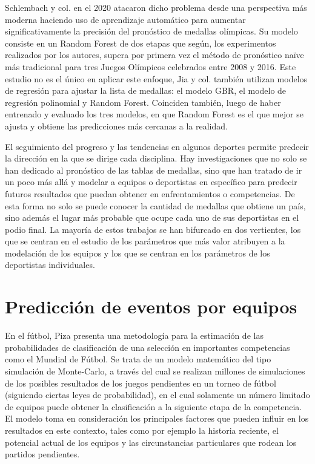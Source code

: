 Schlembach y col. en el 2020 \cite{schlembach2020forecasting} atacaron dicho problema desde una perspectiva más moderna haciendo uso de aprendizaje automático para aumentar significativamente la precisión del pronóstico de medallas olímpicas. Su modelo consiste en un Random Forest de dos etapas que según, los experimentos realizados por los autores, supera por primera vez el método de pronóstico naïve más tradicional para tres Juegos Olímpicos celebrados entre 2008 y 2016. Este estudio no es el único en aplicar este enfoque, Jia y col. también utilizan modelos de regresión para ajustar la lista de medallas: el modelo GBR, el modelo de regresión polinomial y Random Forest. Coinciden también, luego de haber entrenado y evaluado los tres modelos, en que Random Forest es el que mejor se ajusta y obtiene las predicciones más cercanas a la realidad.

El seguimiento del progreso y las tendencias en algunos deportes permite predecir la dirección en la que se dirige cada disciplina. Hay investigaciones que no solo se han dedicado al pronóstico de las tablas de medallas, sino que han tratado de ir un poco más allá y modelar a equipos o deportistas en específico para predecir futuros resultados que puedan obtener en enfrentamientos o competencias. De esta forma no solo se puede conocer la cantidad de medallas que obtiene un país, sino además el lugar más probable que ocupe cada uno de sus deportistas en el podio final. La mayoría de estos trabajos se han bifurcado en dos vertientes, los que se centran en el estudio de los parámetros que más valor atribuyen a la modelación de los equipos y los que se centran en los parámetros de los deportistas individuales. 

\section{Predicción de eventos por equipos}

En el fútbol, Piza \cite{piza2005futbol} presenta una metodología para la estimación de las probabilidades de clasificación de una selección en importantes competencias como el Mundial de Fútbol. Se trata de un modelo matemático del tipo simulación de Monte-Carlo, a través del cual se realizan millones de simulaciones de los posibles resultados de los juegos pendientes en un torneo de fútbol (siguiendo ciertas leyes de probabilidad), en el cual solamente un número limitado de equipos puede obtener la clasificación a la siguiente etapa de la competencia. El modelo toma en consideración los principales factores que pueden influir en los resultados en este contexto, tales como por ejemplo la historia reciente, el potencial actual de los equipos y las circunstancias particulares que rodean los partidos pendientes.

